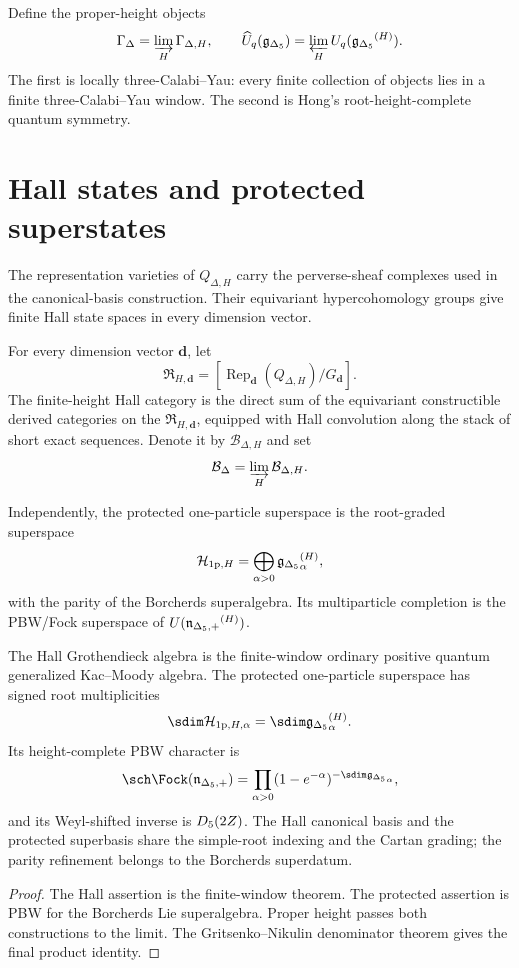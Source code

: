 Define the proper-height objects
\[
 \Gamma_\Delta=\varinjlim_H\Gamma_{\Delta,H},
 \qquad
 \widehat U_q({\mathfrak g_{\Delta_5}})=\varprojlim_H U_q({\mathfrak g_{\Delta_5}}^{(H)}).
\]
The first is locally three-Calabi--Yau: every finite collection of objects lies in a finite three-Calabi--Yau window.  The second is Hong's root-height-complete quantum symmetry.

\chapter{Hall states and protected superstates}
The representation varieties of $Q_{\Delta,H}$ carry the perverse-sheaf complexes used in the canonical-basis construction.  Their equivariant hypercohomology groups give finite Hall state spaces in every dimension vector.

\begin{definition}
For every dimension vector $\mathbf d$, let
\[
 \mathfrak R_{H,\mathbf d}=
 [\operatorname{Rep}_{\mathbf d}(Q_{\Delta,H})/G_{\mathbf d}].
\]
The finite-height Hall category is the direct sum of the equivariant constructible derived categories on the $\mathfrak R_{H,\mathbf d}$, equipped with Hall convolution along the stack of short exact sequences.  Denote it by $\mathcal B_{\Delta,H}$ and set
\[
 \mathcal B_\Delta=\varinjlim_H\mathcal B_{\Delta,H}.
\]
\end{definition}

Independently, the protected one-particle superspace is the root-graded superspace
\[
 \mathcal H_{\mathrm{1p},H}
 =\bigoplus_{\alpha>0}{\mathfrak g_{\Delta_5}}^{(H)}_\alpha,
\]
with the parity of the Borcherds superalgebra.  Its multiparticle completion is the PBW/Fock superspace of $U({\mathfrak n_{\Delta_5,+}}^{(H)})$.

\begin{theorem}
The Hall Grothendieck algebra is the finite-window ordinary positive quantum generalized Kac--Moody algebra.  The protected one-particle superspace has signed root multiplicities
\[
 \sdim\mathcal H_{\mathrm{1p},H,\alpha}
 =\sdim\gIg^{(H)}_\alpha.
\]
Its height-complete PBW character is
\[
 \sch\Fock(\nIg)
 =\prod_{\alpha>0}(1-e^{-\alpha})^{-\sdim\gIg_\alpha},
\]
and its Weyl-shifted inverse is ${D_5}(2Z)$.  The Hall canonical basis and the protected superbasis share the simple-root indexing and the Cartan grading; the parity refinement belongs to the Borcherds superdatum.
\end{theorem}
\begin{proof}
The Hall assertion is the finite-window theorem.  The protected assertion is PBW for the Borcherds Lie superalgebra.  Proper height passes both constructions to the limit.  The Gritsenko--Nikulin denominator theorem gives the final product identity.
\end{proof}

